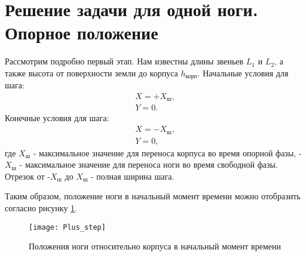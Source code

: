 \section{Решение задачи для одной ноги. Опорное положение}\label{C3_2}
Рассмотрим подробно первый этап. Нам известны длины звеньев $L_{1}$ и $L_{2}$, а также высота от поверхности земли до корпуса $h_{\text{корп}}$. 
Начальные условия для шага:
\begin{equation}
	\begin{array}{l}
		X = +X_{\text{ш}},
		\\
		Y = 0.
	\end{array}
\end{equation}
Конечные условия для шага:
\begin{equation}
	\begin{array}{l}
		X = -X_{\text{ш}},
		\\
		Y = 0,
	\end{array}
	\label{gran_step}
\end{equation}
где $X_{\text{ш}}$ - максимальное значение для переноса корпуса во время опорной фазы, -$X_{\text{ш}}$ - максимальное значение для переноса ноги во время свободной фазы. Отрезок от -$X_{\text{ш}}$ до $X_{\text{ш}}$ - полная ширина шага.  

Таким образом, положение ноги в начальный момент времени можно отобразить согласно рисунку \ref{Plus_step}.
\newline
\begin{figure}[h]
	\begin{center}
		\texttt{[image: Plus\_step]}
		\caption{Положения ноги относительно корпуса в начальный момент времени}
		\label{Plus_step}
	\end{center}
\end{figure}

